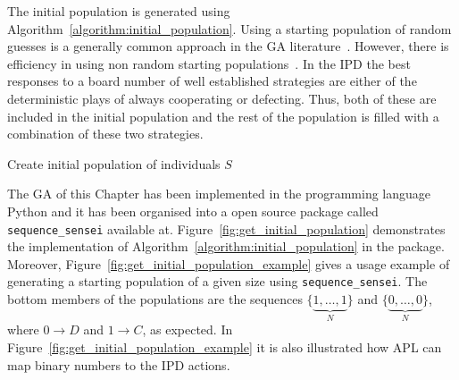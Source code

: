 The initial population is generated using Algorithm~\ref{algorithm:initial_population}.
Using a starting population of random guesses is a generally common approach in
the GA literature~\cite{Hou1994}. However, there is efficiency in using non
random starting populations~\cite{Drezner2005, Osaba2014}.
In the IPD the best responses to a board number of well established strategies
are either of the deterministic plays of always cooperating or defecting.
Thus, both of these are included in the initial population and the rest of
the population is filled with a combination of these two strategies.

\begin{algorithm}[!htbp]
        \SetAlgoLined
    
     \caption{Create initial population of individuals \(S\)}\label{algorithm:initial_population}
\end{algorithm}

The GA of this Chapter has been implemented in the programming language Python
and it has been organised into a open source package called
\texttt{sequence_sensei} available at. %
Figure~\ref{fig:get_initial_population} demonstrates the implementation of
Algorithm~\ref{algorithm:initial_population} in the package. Moreover,
Figure~\ref{fig:get_initial_population_example} gives a usage example of
generating a starting population of a given size using
\texttt{sequence_sensei}.
The bottom members of the populations are the sequences \(\{\underbrace{1, \dots, 1}_{N}\}\) and
\(\{\underbrace{0, \dots, 0}_{N}\}\), where \(0 \to D\) and \(1 \to C\), as expected. In
Figure~\ref{fig:get_initial_population_example} it is also illustrated how APL
can map binary numbers to the IPD actions.

